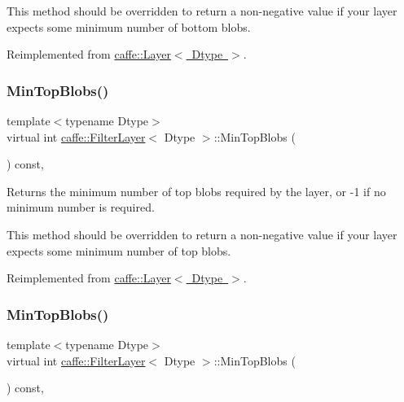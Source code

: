 This method should be overridden to return a non-\/negative value if your layer expects some minimum number of bottom blobs. 

Reimplemented from \mbox{\hyperlink{classcaffe_1_1_layer_aca3cb2bafaefda5d4760aaebd0b72def}{caffe\+::\+Layer$<$ Dtype $>$}}.

\mbox{\label{classcaffe_1_1_filter_layer_af8c6eb9b1986e03dd14a907b5caa1324}} 
\subsubsection{\texorpdfstring{Min\+Top\+Blobs()}{MinTopBlobs()}\hspace{0.1cm}{\footnotesize\ttfamily [1/2]}}
{\footnotesize\ttfamily template$<$typename Dtype$>$ \\
virtual int \mbox{\hyperlink{classcaffe_1_1_filter_layer}{caffe\+::\+Filter\+Layer}}$<$ Dtype $>$\+::Min\+Top\+Blobs (\begin{DoxyParamCaption}{ }\end{DoxyParamCaption}) const\hspace{0.3cm}{\ttfamily [inline]}, {\ttfamily [virtual]}}



Returns the minimum number of top blobs required by the layer, or -\/1 if no minimum number is required. 

This method should be overridden to return a non-\/negative value if your layer expects some minimum number of top blobs. 

Reimplemented from \mbox{\hyperlink{classcaffe_1_1_layer_ab9e4c8d642e413948b131d851a8462a4}{caffe\+::\+Layer$<$ Dtype $>$}}.

\mbox{\label{classcaffe_1_1_filter_layer_af8c6eb9b1986e03dd14a907b5caa1324}} 
\subsubsection{\texorpdfstring{Min\+Top\+Blobs()}{MinTopBlobs()}\hspace{0.1cm}{\footnotesize\ttfamily [2/2]}}
{\footnotesize\ttfamily template$<$typename Dtype$>$ \\
virtual int \mbox{\hyperlink{classcaffe_1_1_filter_layer}{caffe\+::\+Filter\+Layer}}$<$ Dtype $>$\+::Min\+Top\+Blobs (\begin{DoxyParamCaption}{ }\end{DoxyParamCaption}) const\hspace{0.3cm}{\ttfamily [inline]}, {\ttfamily [virtual]}}



